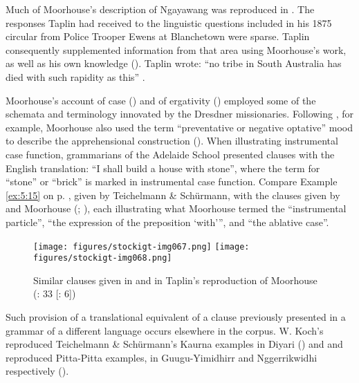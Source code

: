 Much of Moorhouse’s description of Ngayawang \citeyearpar{moorhouse_vocabulary_1846} was reproduced in \citet{taplin_1879a_nodate}. The responses Taplin had received to the linguistic questions included in his 1875 circular from Police Trooper Ewens \citep[30]{taplin_1879a} at Blanche\-town were sparse. Taplin consequently supplemented information from that area using Moorhouse’s work, as well as his own knowledge (\citeyear[32]{taplin_1879a_nodate}). Taplin wrote: “no tribe in South Australia has died with such rapidity as this” \citep[31]{taplin_1879a_nodate}.

Moorhouse’s account of case () and of ergativity () employed some of the schemata and terminology innovated by the Dresdner missionaries. Following \citet{teichelmann_outlines_1840}, for example, Moorhouse also used the term “preventative or negative optative” mood to describe the apprehensional construction (). When illustrating instrumental case function, grammarians of the Adelaide School presented clauses with the English translation: “I shall build a house with stone'', where the term for “stone” or “brick” is marked in instrumental case function. Compare Example \ref{ex:5:15} on p. \pageref{ex:5:15}, given by Teichelmann \& Schürmann, with the clauses given by \citet[15]{meyer_vocabulary_1843} and Moorhouse (\citeyear[6]{moorhouse_vocabulary_1846}; ), each illustrating what Moorhouse termed the “instrumental particle'', \citet[15]{meyer_vocabulary_1843} “the expression of the preposition `with'\thinspace'', and \citet[24]{teichelmann_outlines_1840} “the ablative case''.

\begin{figure}
\texttt{[image: figures/stockigt-img067.png]}
\texttt{[image: figures/stockigt-img068.png]}
\caption{Similar clauses given in \citet[15]{meyer_vocabulary_1843} and in Taplin’s reproduction of Moorhouse (\citeyear{taplin_1879a_nodate}: 33 [\citeyear{moorhouse_vocabulary_1846}: 6])}
\label{fig:key:121}
\end{figure}

Such provision of a translational equivalent of a clause previously presented in a grammar of a different language occurs elsewhere in the corpus. W. Koch’s reproduced Teichelmann \& Schürmann’s Kaurna examples in Diyari () and \citet{schwarz_koko_1900} and \citet{hey_elementary_1903} reproduced  Pitta-Pitta examples, in Guugu-Yimidhirr and Nggerrikwidhi respectively ().

